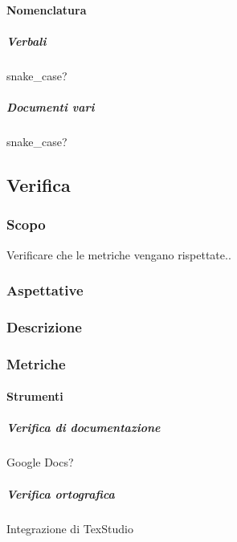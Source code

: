 			\paragraph{Nomenclatura}

			\subparagraph{Verbali}
			snake\_case?

			\subparagraph{Documenti vari}
			snake\_case?

	\subsection{Verifica}

		\subsubsection{Scopo}
		Verificare che le metriche vengano rispettate..

		\subsubsection{Aspettative}

		\subsubsection{Descrizione}

		\subsubsection{Metriche}




			\paragraph{Strumenti}

			\subparagraph{Verifica di documentazione}
			Google Docs?

			\subparagraph{Verifica ortografica}
			Integrazione di TexStudio


